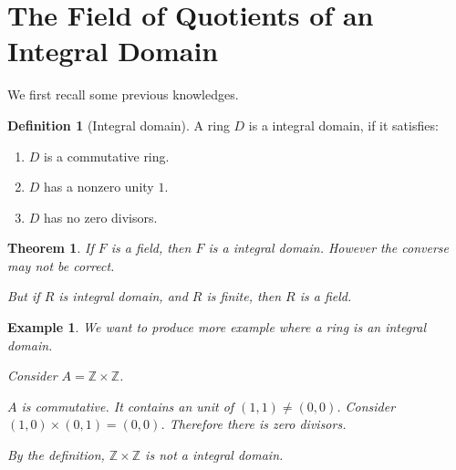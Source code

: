 \documentclass{article}
\theoremstyle{MyNonumberplain}
\theoremstyle{break}
\theoremstyle{break}
\newtheorem{theorem}{Theorem}[section]
\newtheorem{example}{Example}[section]
\theoremstyle{break}
\theoremstyle{definition}
\theoremstyle{break}
\newtheorem{definition}{Definition}[section]
\begin{document}
\section{The Field of Quotients of an Integral Domain}

We first recall some previous knowledges.

\begin{defbox}
    \begin{definition}[Integral domain]
        A ring $D$ is a integral domain, if it satisfies:\bigskip
        \begin{enumerate}
          \item $D$ is a commutative ring.\bigskip
          
          \item $D$ has a nonzero unity $1$.\bigskip
          
          \item $D$ has no zero divisors.
        \end{enumerate}
    \end{definition}
\end{defbox}

\begin{thmbox}
    \begin{theorem}
        If $F$ is a field, then $F$ is a integral domain. However the converse may not
        be correct.\bigskip
        
        But if $R$ is integral domain, and $R$ is finite, then $R$ is a field.
    \end{theorem}
\end{thmbox}


\begin{expbox}
    \begin{example}
        We want to produce more example where a ring is an integral domain.\bigskip

        Consider $A =\mathbb{Z} \times \mathbb{Z}$.\bigskip
        
        $A$ is commutative. It contains an unit of $(1, 1) \neq (0, 0)$. Consider $(1,
        0) \times (0, 1) = (0, 0)$. Therefore there is zero divisors.\bigskip
        
        By the definition, $\mathbb{Z} \times \mathbb{Z}$ is not a integral domain. 
    \end{example}
\end{expbox}
\end{document}
